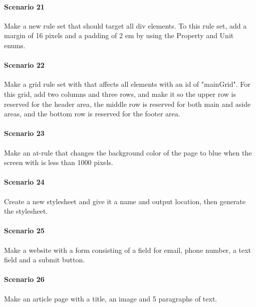 \documentclass[12pt]{article}
\begin{document}
\paragraph{Scenario 21}
Make a new rule set that should target all div elements. To this rule set, add a margin of 16 pixels and a padding of 2 em by using the Property and Unit enums.

\paragraph{Scenario 22}
Make a grid rule set with that affects all elements with an id of "mainGrid". For this grid, add two columns and three rows, and make it so the upper row is reserved for the header area, the middle row  is reserved for both main and aside areas, and the bottom row is reserved for the footer area.

\paragraph{Scenario 23}
Make an at-rule that changes the background color of the page to blue when the screen with is less than 1000 pixels.

\paragraph{Scenario 24}
Create a new stylesheet and give it a name and output location, then generate the stylesheet.

\paragraph{Scenario 25}
Make a website with a form consisting of a field for email, phone number, a text field and a submit button.

\paragraph{Scenario 26}
Make an article page with a title, an image and 5 paragraphs of text.
\end{document}
